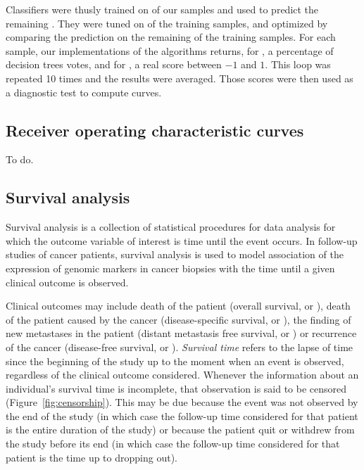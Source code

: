 Classifiers were thusly trained on  of our samples and used to
predict the remaining .  They were tuned on  of the
training samples, and optimized by comparing the prediction on the remaining
 of the training samples.  For each sample, our implementations of
the algorithms returns, for , a percentage of decision trees
votes, and for , a real score between $-1$ and $1$.  This loop
was repeated 10 times and the results were averaged.  Those scores were then
used as a diagnostic test to compute  curves.

\subsection{Receiver operating characteristic curves}
\label{sec:methods-roc}

To do.


\subsection{Survival analysis}
\label{sec:methods-survival-analysis}

Survival analysis is a collection of statistical procedures for data analysis
for which the outcome variable of interest is time until the event
occurs.\cite{kleinbaum_survival_1996} In follow-up studies of cancer patients,
survival analysis is used to model association of the expression of genomic
markers in cancer biopsies with the time until a given clinical outcome is
observed.

Clinical outcomes may include death of the patient (overall survival, or
), death of the patient caused by the cancer (disease-specific
survival, or ), the finding of new metastases in the patient
(distant metastasis free survival, or ) or recurrence of the
cancer (disease-free survival, or ).  \emph{Survival time} refers
to the lapse of time since the beginning of the study up to the moment when an
event is observed, regardless of the clinical outcome considered.  Whenever the
information about an individual's survival time is incomplete, that observation
is said to be censored (Figure~\ref{fig:censorship}).  This may be due because
the event was not observed by the end of the study (in which case the follow-up
time considered for that patient is the entire duration of the study) or because
the patient quit or withdrew from the study before its end (in which case the
follow-up time considered for that patient is the time up to dropping out).

